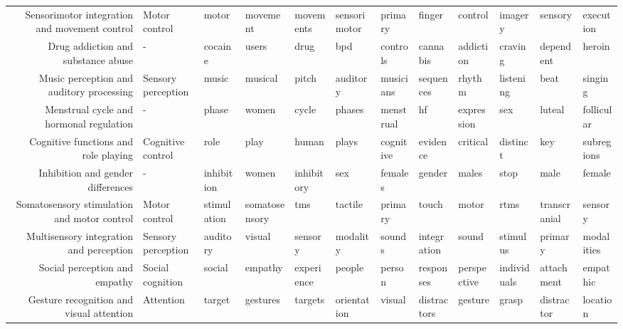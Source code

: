\begin{tabular}{rlllllllllll}
     Sensorimotor integration and movement control &       Motor control &            motor &      movement &       movements &   sensorimotor &     primary &         finger &       control &        imagery &       sensory &      execution \\
                Drug addiction and substance abuse &                   - &          cocaine &         users &            drug &            bpd &    controls &       cannabis &     addiction &        craving &     dependent &         heroin \\
          Music perception and auditory processing &  Sensory perception &            music &       musical &           pitch &       auditory &   musicians &      sequences &        rhythm &      listening &          beat &        singing \\
           Menstrual cycle and hormonal regulation &                   - &            phase &         women &           cycle &         phases &   menstrual &             hf &    expression &            sex &        luteal &     follicular \\
              Cognitive functions and role playing &   Cognitive control &             role &          play &           human &          plays &   cognitive &       evidence &      critical &       distinct &           key &     subregions \\
                 Inhibition and gender differences &                   - &       inhibition &         women &      inhibitory &            sex &     females &         gender &         males &           stop &          male &         female \\
       Somatosensory stimulation and motor control &       Motor control &      stimulation & somatosensory &             tms &        tactile &     primary &          touch &         motor &           rtms &  transcranial &        sensory \\
           Multisensory integration and perception &  Sensory perception &         auditory &        visual &         sensory &       modality &      sounds &    integration &         sound &       stimulus &       primary &     modalities \\
                     Social perception and empathy &    Social cognition &           social &       empathy &      experience &         people &      person &      responses &   perspective &    individuals &    attachment &       empathic \\
          Gesture recognition and visual attention &           Attention &           target &      gestures &         targets &    orientation &      visual &    distractors &       gesture &          grasp &    distractor &       location \\

\end{tabular}
